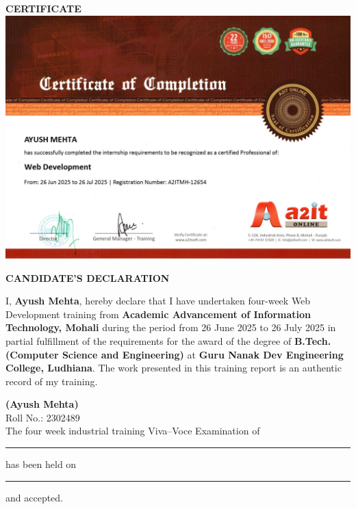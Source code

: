 \documentclass[a4paper,12pt,oneside]{report}
\numberwithin{equation}{chapter}
\numberwithin{figure}{chapter}
\numberwithin{table}{chapter}
\begin{document}
\newpage
\begin{center}
    \large\textbf{CERTIFICATE}\\[6mm]
    \includegraphics[width=\textwidth, keepaspectratio]{certificate.jpg}
\end{center}

\newpage
\begin{center}
    \large\textbf{CANDIDATE'S DECLARATION}
\end{center}

I, \textbf{Ayush Mehta}, hereby declare that I have undertaken four-week Web Development training from \textbf{Academic Advancement of Information Technology, Mohali} during the period from 26 June 2025 to 26 July 2025 in partial fulfillment of the requirements for the award of the degree of \textbf{B.Tech. (Computer Science and Engineering)} at \textbf{Guru Nanak Dev Engineering College, Ludhiana}. The work presented in this training report is an authentic record of my training.

\vspace{15mm}
\noindent
\textbf{(Ayush Mehta)}\\
Roll No.: 2302489\\[10mm]
The four week industrial training Viva--Voce Examination of \rule{4cm}{0.4pt} has been held on \rule{3cm}{0.4pt} and accepted.

\vspace{45mm}
\end{document}
